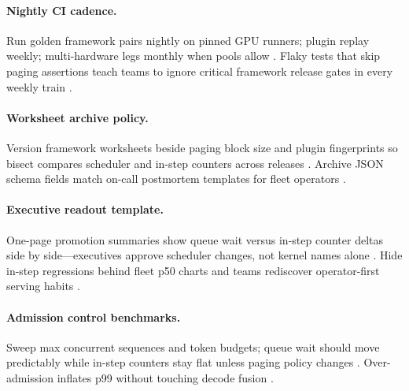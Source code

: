 \paragraph{Nightly CI cadence.} Run golden framework pairs nightly on pinned GPU runners; plugin replay weekly; multi-hardware legs monthly when pools allow \citep{yirage2026,chen2020compilerbasedhardw,patel2025llminference,kwon2023vllm,taxbreak2026,memoryfloor2026,liu2024deepseekv3,nvidia2024cudagraphs,dao2022flashattention,amd2024aie,amd2024xdna,dlbook,dao2023flashdecoding,nvidia2022hopper,semianalysis2024tma}. Flaky tests that skip paging assertions teach teams to ignore critical framework release gates in every weekly train \citep{patel2025llminference,yirage2026,chen2020compilerbasedhardw,kwon2023vllm,memoryfloor2026,taxbreak2026,dlbook}.

\paragraph{Worksheet archive policy.} Version framework worksheets beside paging block size and plugin fingerprints so bisect compares scheduler and in-step counters across releases \citep{yirage2026,chen2020compilerbasedhardw,patel2025llminference,kwon2023vllm,taxbreak2026,memoryfloor2026,liu2024deepseekv3,nvidia2024cudagraphs,dao2022flashattention,amd2024aie,amd2024xdna,dlbook,dao2023flashdecoding,nvidia2022hopper,semianalysis2024tma}. Archive JSON schema fields match on-call postmortem templates for fleet operators \citep{patel2025llminference,yirage2026,chen2020compilerbasedhardw,kwon2023vllm,dlbook}.

\paragraph{Executive readout template.} One-page promotion summaries show queue wait versus in-step counter deltas side by side---executives approve scheduler changes, not kernel names alone \citep{patel2025llminference,taxbreak2026,memoryfloor2026,yirage2026,chen2020compilerbasedhardw,kwon2023vllm,liu2024deepseekv3,nvidia2024cudagraphs,dao2022flashattention,amd2024aie,amd2024xdna,dlbook,dao2023flashdecoding,nvidia2022hopper,semianalysis2024tma}. Hide in-step regressions behind fleet p50 charts and teams rediscover operator-first serving habits \citep{patel2025llminference,taxbreak2026,memoryfloor2026,yirage2026,chen2020compilerbasedhardw,dlbook}.


\paragraph{Admission control benchmarks.} Sweep max concurrent sequences and token budgets; queue wait should move predictably while in-step counters stay flat unless paging policy changes \citep{kwon2023vllm,patel2025llminference,taxbreak2026,memoryfloor2026,yirage2026,chen2020compilerbasedhardw,liu2024deepseekv3,nvidia2024cudagraphs,dao2022flashattention,amd2024aie,amd2024xdna,dlbook,dao2023flashdecoding,nvidia2022hopper,semianalysis2024tma}. Over-admission inflates p99 without touching decode fusion \citep{patel2025llminference,kwon2023vllm,yirage2026,chen2020compilerbasedhardw,memoryfloor2026,taxbreak2026,dlbook}.

